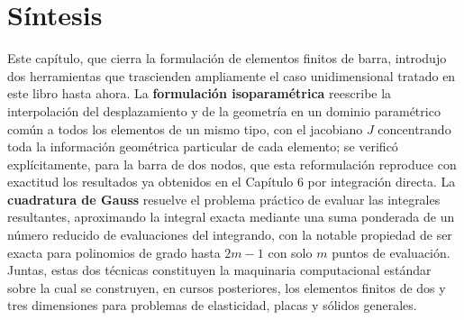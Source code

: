 \section{Síntesis}

Este capítulo, que cierra la formulación de elementos finitos de barra, introdujo dos herramientas que trascienden ampliamente el caso unidimensional tratado en este libro hasta ahora. La \textbf{formulación isoparamétrica} reescribe la interpolación del desplazamiento y de la geometría en un dominio paramétrico común a todos los elementos de un mismo tipo, con el jacobiano $J$ concentrando toda la información geométrica particular de cada elemento; se verificó explícitamente, para la barra de dos nodos, que esta reformulación reproduce con exactitud los resultados ya obtenidos en el Capítulo 6 por integración directa. La \textbf{cuadratura de Gauss} resuelve el problema práctico de evaluar las integrales resultantes, aproximando la integral exacta mediante una suma ponderada de un número reducido de evaluaciones del integrando, con la notable propiedad de ser exacta para polinomios de grado hasta $2m-1$ con solo $m$ puntos de evaluación. Juntas, estas dos técnicas constituyen la maquinaria computacional estándar sobre la cual se construyen, en cursos posteriores, los elementos finitos de dos y tres dimensiones para problemas de elasticidad, placas y sólidos generales.
